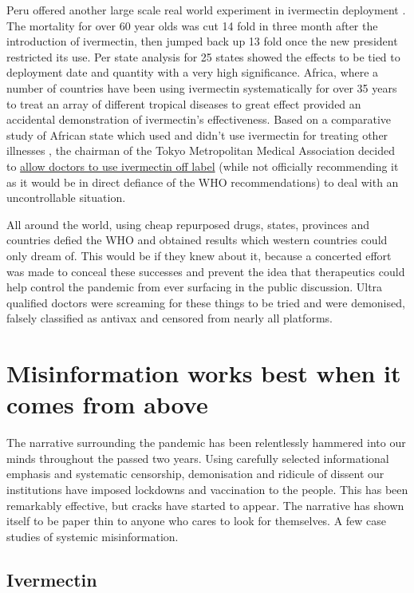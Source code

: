 \documentclass[11pt,a4paper]{article}
\begin{document}
Peru offered another large scale real world experiment in ivermectin deployment \cite{Chamie2021}. The mortality for over 60 year olds was cut 14 fold in three month after the introduction of ivermectin, then jumped back up 13 fold once the new president restricted its use. Per state analysis for 25 states showed the effects to be tied to deployment date and quantity with a very high significance. Africa, where a number of countries have been using ivermectin systematically for over 35 years to treat an array of different tropical diseases to great effect provided an accidental demonstration of ivermectin’s effectiveness. Based on a comparative study of African state which used and didn’t use ivermectin for treating other illnesses \cite{Tanioka2021.03.26.21254377}, the chairman of the Tokyo Metropolitan Medical Association decided to \href{https://www.tokyo-np.co.jp/article/123988}{allow doctors to use ivermectin off label} (while not officially recommending it as it would be in direct defiance of the WHO recommendations) to deal with an uncontrollable situation.

All around the world, using cheap repurposed drugs, states, provinces and countries defied the WHO and obtained results which western countries could only dream of. This would be if they knew about it, because a concerted effort was made to conceal these successes and prevent the idea that therapeutics could help control the pandemic from ever surfacing in the public discussion. Ultra qualified doctors were screaming for these things to be tried and were demonised, falsely classified as antivax and censored from nearly all platforms. 

\section*{Misinformation works best when it comes from above}

The narrative surrounding the pandemic has been relentlessly hammered into our minds throughout the passed two years. Using carefully selected informational emphasis and systematic censorship, demonisation and ridicule of dissent our institutions have imposed lockdowns and vaccination to the people. This has been remarkably effective, but cracks have started to appear. The narrative has shown itself to be paper thin to anyone who cares to look for themselves. A few case studies of systemic misinformation.

\subsection*{Ivermectin}
\end{document}
